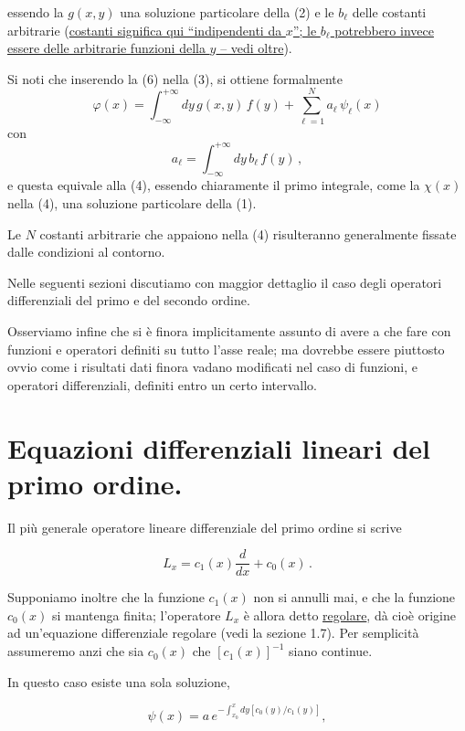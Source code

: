 \documentclass[11pt, a4paper]{book}
\numberwithin{equation}{section}
\begin{document}
essendo la $g(x,y)$ una soluzione particolare della (2) e le $b_\ell$ delle costanti arbitrarie (\uline{costanti significa qui ``indipendenti da $x$''; le $b_\ell$ potrebbero invece essere delle arbitrarie funzioni della $y$ -- vedi oltre}).

Si noti che inserendo la (6) nella (3), si ottiene formalmente
\[
    \varphi(x) = \int_{-\infty}^{+\infty} dy \, g(x,y) \, f(y) + \sum_{\ell=1}^{N} a_\ell \, \psi_\ell(x)
\]
con
\[
    a_\ell = \int_{-\infty}^{+\infty} dy \, b_\ell \, f(y) \,,
\]
e questa equivale alla (4), essendo chiaramente il primo integrale, come la $\chi(x)$ nella (4), una soluzione particolare della (1).

Le $N$ costanti arbitrarie che appaiono nella (4) risulteranno generalmente fissate dalle condizioni al contorno.

Nelle seguenti sezioni discutiamo con maggior dettaglio il caso degli operatori differenziali del primo e del secondo ordine.

Osserviamo infine che si è finora implicitamente assunto di avere a che fare con funzioni e operatori definiti su tutto l'asse reale; ma dovrebbe essere piuttosto ovvio come i risultati dati finora vadano modificati nel caso di funzioni, e operatori differenziali, definiti entro un certo intervallo.


\section{Equazioni differenziali lineari del primo ordine.}

Il più generale operatore lineare differenziale del primo ordine si scrive

\begin{equation}
    L_x = c_1(x) \frac{d}{dx} + c_0(x) \,.
\end{equation}

Supponiamo inoltre che la funzione $c_1(x)$ non si annulli mai, e che la funzione $c_0(x)$ si mantenga finita; l'operatore $L_x$ è allora detto \uline{regolare}, dà cioè origine ad un'equazione differenziale regolare (vedi la sezione 1.7). Per semplicità assumeremo anzi che sia $c_0(x)$ che $[c_1(x)]^{-1}$ siano continue.

In questo caso esiste una sola soluzione,

\begin{equation}
    \psi(x) = a \, e^{\displaystyle -\int_{x_0}^{x} dy \left[ c_0(y) / c_1(y) \right]},
\end{equation}
\end{document}
